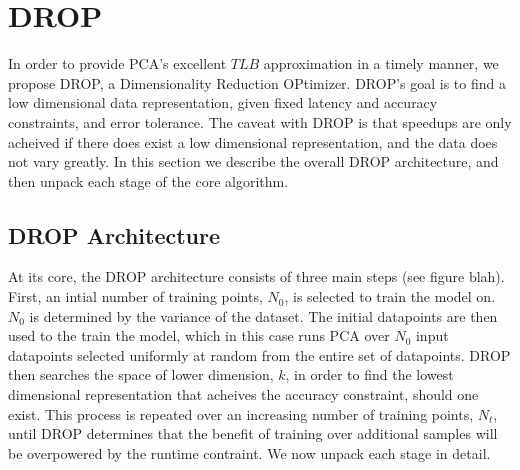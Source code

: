 \section{DROP}
\label{sec:algorithm}

In order to provide PCA's excellent $TLB$ approximation in a timely manner, we propose DROP, a Dimensionality Reduction OPtimizer. DROP's goal is to find a low dimensional data representation, given fixed latency and accuracy constraints, and error tolerance. The caveat with DROP is that speedups are only acheived if there does exist a low dimensional representation, and the data does not vary greatly. In this section we describe the overall DROP architecture, and then unpack each stage of the core algorithm. 

\subsection{DROP Architecture}
At its core, the DROP architecture consists of three main steps (see figure blah). First, an intial number of training points, $N_0$, is selected to train the model on. $N_0$ is determined by the variance of the dataset. The initial datapoints are then used to the train the model, which in this case runs PCA over $N_0$ input datapoints selected uniformly at random from the entire set of datapoints. DROP then searches the space of lower dimension, $k$, in order to find the lowest dimensional representation that acheives the accuracy constraint, should one exist. This process is repeated over an increasing number of training points, $N_t$, until DROP determines that the benefit of training over additional samples will be overpowered by the runtime contraint. We now unpack each stage in detail.

